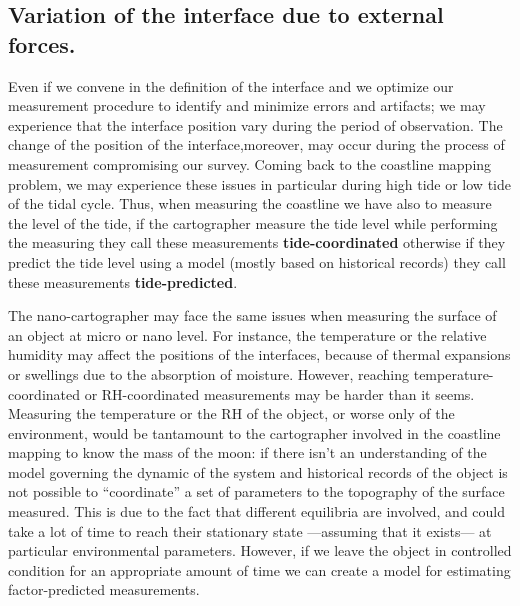 \subsection{Variation of the interface due to external forces.} 
Even if we convene in the definition of the interface and we optimize our measurement procedure to identify and minimize errors and artifacts; we may experience that the interface position vary during the period of observation. The change of the position of the interface,moreover, may occur during the process of measurement compromising our survey. Coming back to the coastline mapping problem, we may experience these issues in particular during high tide or low tide of the tidal cycle.  Thus, when measuring the coastline we have also to measure the level of the tide, if the cartographer measure the tide level while performing the measuring they call these measurements \textbf{tide-coordinated} otherwise if they predict the tide level using a model (mostly based on historical records) they call these measurements \textbf{tide-predicted}.  
\par The nano-cartographer may face the same issues when measuring the surface of an object at micro or nano level. For instance, the temperature or the relative humidity may affect the positions of the interfaces, because of thermal expansions or swellings due to the absorption of moisture.
However, reaching temperature-coordinated or RH-coordinated measurements may be harder than it seems. Measuring the temperature or the RH of the object, or worse only of the environment,  would be tantamount to the cartographer involved in the coastline mapping to know the mass of the moon: if there isn't an understanding of the model governing the dynamic of the system and historical records of the object is not possible to ``coordinate'' a set of parameters to the topography of the surface measured. This is due to the fact that different equilibria are involved, and could take a lot of time to reach their stationary state  ---assuming that it exists--- at particular environmental parameters. However, if we leave the object in controlled condition for an appropriate amount of time we can create a model for estimating factor-predicted measurements.   

